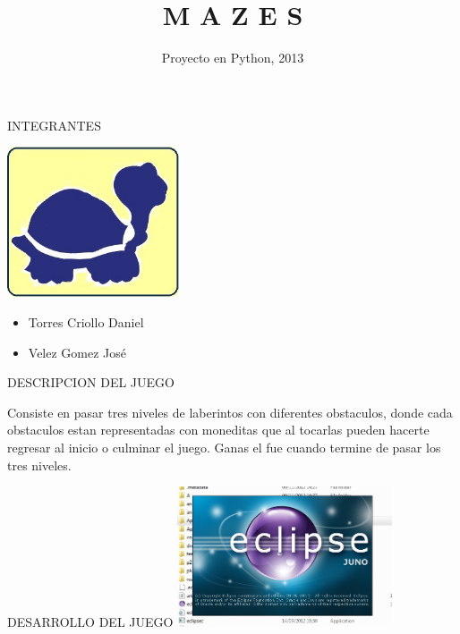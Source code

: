 \documentclass{beamer}
\title[PROYECTO - PYTHON] 
{M A Z E S}
\subtitle{}
\institute[ESCUELA SUPERIOR]
{	
	\centering
  		
	ESCUELA SUPERIOR\\
	POLITECNICA DEL LITORAL
}
\date[CFP 2013]{Proyecto en Python, 2013}
\begin{document}
	\begin{frame}
  	  \titlepage
	\end{frame}
	
	\begin {frame}{INTEGRANTES}
		 \begin{flushleft}
 			\includegraphics[totalheight=1.2in,width=2in]{LTwitspol}
 		 \end{flushleft}
 		 
 		 \begin{itemize}
 		 	\item
				\begin{flushright} 		 		
 		 		Torres Criollo Daniel
 		 		\end{flushright}
 		 	\item
 		 		\begin{flushright}
 		 			Velez Gomez José
 		 		\end{flushright}
 		 \end{itemize}
  	\end{frame}
  	  	
  	\begin{frame}{DESCRIPCION DEL JUEGO}
  		\centering
  		\begin{block}{}
  		Consiste en pasar tres niveles de laberintos con diferentes obstaculos, donde cada obstaculos estan representadas con moneditas que al tocarlas pueden hacerte regresar al inicio o culminar el juego. Ganas el fue cuando termine de pasar los tres niveles.
  		
  		\end{block}				
	\end{frame}

		
	\begin{frame}{DESARROLLO DEL JUEGO}
		\centering
  		\includegraphics[totalheight=1.8in,width=2.5in]{ecliipse}	
  						
	\end{frame}
\end{document}
